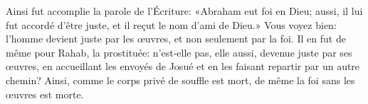 Ainsi fut accomplie la parole de l’Écriture:
	«Abraham eut foi en Dieu;
	aussi, il lui fut accordé d’être juste,
	et il reçut le nom d’ami de Dieu.»
Vous voyez bien:
	l’homme devient juste par les œuvres, et non seulement par la foi.
Il en fut de même pour Rahab, la prostituée:
	n’est-elle pas, elle aussi, devenue juste par ses œuvres,
	en accueillant les envoyés de Josué
	et en les faisant repartir par un autre chemin?
Ainsi, comme le corps privé de souffle est mort,
	de même la foi sans les œuvres est morte.
